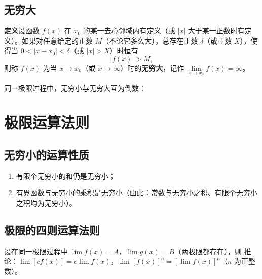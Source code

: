 \subsection{无穷大}
\textbf{定义}\quad 设函数 $f(x)$ 在 $x_0$ 的某一去心邻域内有定义（或 $|x|$ 大于某一正数时有定义）。如果对任意给定的正数 $M$（不论它多么大），总存在正数 $\delta$（或正数 $X$），使得当 $0<|x-x_0|<\delta$（或 $|x|>X$）时恒有
\[
|f(x)|>M,
\]
则称 $f(x)$ 为当 $x\to x_0$（或 $x\to\infty$）时的\textbf{无穷大}，记作 $\lim\limits_{x\to x_0}f(x)=\infty$。

同一极限过程中，无穷小与无穷大互为倒数：


\section{极限运算法则}

\subsection{无穷小的运算性质}
\begin{enumerate}
    \item 有限个无穷小的和仍是无穷小；
    \item 有界函数与无穷小的乘积是无穷小（由此：常数与无穷小之积、有限个无穷小之积均为无穷小）。
\end{enumerate}


\subsection{极限的四则运算法则}
设在同一极限过程中 $\lim f(x)=A$，$\lim g(x)=B$（两极限都存在），则
\noindent 推论：$\lim[cf(x)]=c\lim f(x)$，$\lim[f(x)]^n=[\lim f(x)]^n$（$n$ 为正整数）。

